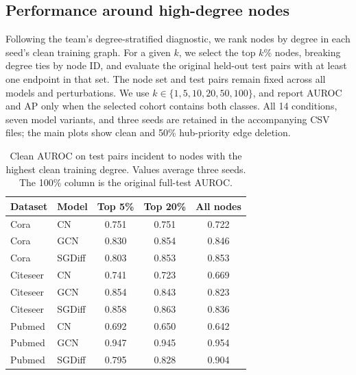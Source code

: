 \subsection{Performance around high-degree nodes}

Following the team's degree-stratified diagnostic, we rank nodes by degree in each seed's clean training graph. For a given $k$, we select the top $k\%$ nodes, breaking degree ties by node ID, and evaluate the original held-out test pairs with at least one endpoint in that set. The node set and test pairs remain fixed across all models and perturbations. We use $k\in\{1,5,10,20,50,100\}$, and report AUROC and AP only when the selected cohort contains both classes. All 14 conditions, seven model variants, and three seeds are retained in the accompanying CSV files; the main plots show clean and 50\% hub-priority edge deletion.

\begin{table}[H]

\centering

\small

\begin{tabular}{llccc}

\toprule

Dataset & Model & Top 5\% & Top 20\% & All nodes \\

\midrule

Cora & CN & 0.751 & 0.751 & 0.722 \\

Cora & GCN & 0.830 & 0.854 & 0.846 \\

Cora & SGDiff & 0.803 & 0.853 & 0.853 \\

\midrule

Citeseer & CN & 0.741 & 0.723 & 0.669 \\

Citeseer & GCN & 0.854 & 0.843 & 0.823 \\

Citeseer & SGDiff & 0.858 & 0.863 & 0.836 \\

\midrule

Pubmed & CN & 0.692 & 0.650 & 0.642 \\

Pubmed & GCN & 0.947 & 0.945 & 0.954 \\

Pubmed & SGDiff & 0.795 & 0.828 & 0.904 \\

\bottomrule

\end{tabular}

\caption{Clean AUROC on test pairs incident to nodes with the highest clean training degree. Values average three seeds. The 100\% column is the original full-test AUROC.}

\label{tab:topdegree}

\end{table}

